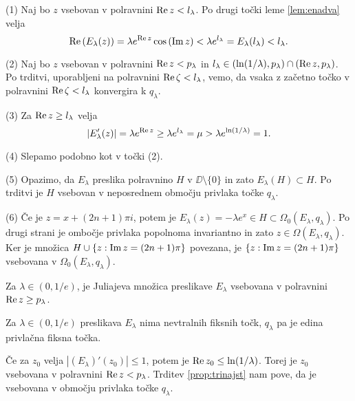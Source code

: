 \begin{dokaz}
    (1) Naj bo \(z\) vsebovan v polravnini \(\operatorname{Re} z < l_\lambda\). Po drugi točki leme \ref{lem:enadva} velja
    \[\operatorname{Re} \left( E_\lambda (z) \right) = \lambda e^{\operatorname{Re} z} \cos \left( \operatorname{Im} z \right) < \lambda e^{l_\lambda} = E_\lambda (l_\lambda) < l_\lambda.\]

    (2) Naj bo \(z\) vsebovan v polravnini \(\operatorname{Re} z < p_\lambda\) in \(l_\lambda \in (\ln (1 / \lambda), p_\lambda) \cap (\operatorname{Re} z, p_\lambda)\). Po  trditvi, uporabljeni na polravnini \(\operatorname{Re} \zeta < l_\lambda\), vemo, da vsaka z začetno točko v polravnini \(\operatorname{Re} \zeta < l_\lambda\) konvergira k \(q_\lambda\).

    (3) Za \(\operatorname{Re} z \geq l_\lambda\) velja
    \[|E_\lambda' (z)| = \lambda e^{\operatorname{Re} z} \geq \lambda e^{l_\lambda} = \mu > \lambda e^{\ln (1 / \lambda)} = 1.\]

    (4) Slepamo podobno kot v točki (2).

    (5) Opazimo, da \(E_\lambda\) preslika polravnino \(H\) v \(\DD \setminus \{0\}\) in zato \(E_\lambda (H) \subset H\). Po  trditvi je \(H\) vsebovan v neposrednem območju privlaka točke \(q_\lambda\).

    (6) Če je \(z = x + (2n + 1) \pi i\), potem je \(E_\lambda (z) = - \lambda e^x \in H \subset \Omega_0 (E_\lambda, q_\lambda)\). Po drugi strani je ombočje privlaka popolnoma invariantno in zato \(z \in \Omega (E_\lambda, q_\lambda)\). Ker je množica \(H \cup \left\{ z : \operatorname{Im} z = (2n + 1) \pi \right\}\) povezana, je \(\left\{ z : \operatorname{Im} z = (2n + 1) \pi \right\}\) vsebovana v \(\Omega_0 (E_\lambda, q_\lambda)\).
\end{dokaz}

\begin{posledica}
    Za \(\lambda \in (0, 1/e)\), je Juliajeva množica preslikave \(E_\lambda\) vsebovana v polravnini \(\operatorname{Re} z \geq p_\lambda\).
\end{posledica}

\begin{posledica}
    Za \(\lambda \in (0, 1/e)\) preslikava \(E_\lambda\) nima nevtralnih fiksnih točk, \(q_\lambda\) pa je edina privlačna fiksna točka.
\end{posledica}

\begin{dokaz}
    Če za \(z_0\) velja \(|(E_\lambda)' (z_0)| \leq 1\), potem je \(\operatorname{Re} z_0 \leq \ln (1 / \lambda)\). Torej je \(z_0\) vsebovana v polravnini \(\operatorname{Re} z < p_\lambda\). Trditev \ref{prop:trinajst} nam pove, da je vsebovana v območju privlaka točke \(q_\lambda\).
\end{dokaz}

